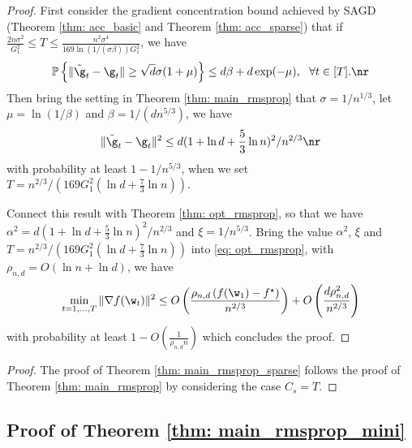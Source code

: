 \begin{proof}
First consider the gradient concentration bound achieved by SAGD (Theorem \ref{thm: acc_basic} and Theorem \ref{thm: acc_sparse}) that if $ \frac{2n\sigma^2}{G_1^2}\leq T \leq \frac{n^2 \sigma^4}{169 \ln(1/(\sigma \beta))G_1^2}$, we have 
\begin{equation}
\begin{split}
\mathbb{P}\left\{\|\tilde \g_t - \g_t\| \geq \sqrt{d}\sigma(1+\mu)\right\} \leq d\beta + d\exp(-\mu), \ \ \forall t \in [T].
\end{split} \nr
\end{equation}
Then bring the setting in Theorem \ref{thm: main_rmsprop} that $\sigma = 1/n^{1/3}$, let $\mu = \ln (1/\beta)$ and $\beta = 1/(d n^{5/3})$, we have
\begin{equation}
 \|\tilde \g_t - \g_t\|^2 \leq d(1+\ln d + \frac{5}{3}\ln n)^2/n^{2/3}    \nr
\end{equation}
with probability at least $1- 1/n^{5/3}$, when we set $T = n^{2/3}/\left(169G_1^2(\ln d + \frac{7}{3}\ln n)\right)$. 

Connect this result with Theorem \ref{thm: opt_rmsprop}, so that we have $\alpha^2 = d(1+\ln d + \frac{5}{3}\ln n)^2/n^{2/3}$ and $\xi = 1/n^{5/3}$. Bring the value $\alpha^2$, $\xi$ and $T = n^{2/3}/\left(169G_1^2(\ln d + \frac{7}{3}\ln n)\right)$ into \eqref{eq: opt_rmsprop}, with $\rho_{n,d} = O \left(\ln n + \ln d \right)$, we have
\begin{align*}
\min_{t = 1,..., T}\|\nabla f(\w_t)\|^2 \leq O\left( \frac{\rho_{n,d} \left(f(\w_1) - f^\star \right)}{n^{2/3}} \right) + O \left( \frac{d \rho_{n,d}^2}{n^{2/3}}\right)
\end{align*}
with probability at least $1-O\left(\frac{1}{\rho_{n,d} n}\right)$ which concludes the proof.
\end{proof}


\theormspropsparse*


\begin{proof}
The proof of Theorem \ref{thm: main_rmsprop_sparse} follows the proof of Theorem \ref{thm: main_rmsprop} by considering the case $C_{s} = T$.
\end{proof}


\subsection{Proof of Theorem \ref{thm: main_rmsprop_mini}} 

\theomini*

